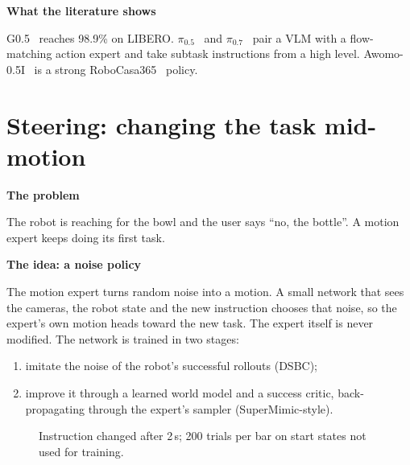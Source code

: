 \documentclass[11pt,a4paper]{article}
\newcommand{\pzf}{$\pi_{0.5}$}
\newcommand{\pzs}{$\pi_{0.7}$}
\newcommand{\sub}[1]{\par\needspace{4\baselineskip}\smallskip\noindent\textbf{#1}\par}
\begin{document}
\sub{What the literature shows}
G0.5~\cite{g05} reaches 98.9\% on LIBERO. \pzf~\cite{pi05} and \pzs~\cite{pi07} pair a VLM with a flow-matching action expert and take subtask instructions from a high level. Awomo-0.5I~\cite{awomo} is a strong RoboCasa365~\cite{robocasa365} policy.

\section{Steering: changing the task mid-motion}
\label{sec:steer}
\sub{The problem}
The robot is reaching for the bowl and the user says ``no, the bottle''. A motion expert keeps doing its first task.

\sub{The idea: a noise policy}
The motion expert turns random noise into a motion. A small network that sees the cameras, the robot state and the new instruction chooses that noise, so the expert's own motion heads toward the new task. The expert itself is never modified. The network is trained in two stages:
\begin{enumerate}
\item imitate the noise of the robot's successful rollouts (DSBC);
\item improve it through a learned world model and a success critic, back-propagating through the expert's sampler (SuperMimic-style).
\end{enumerate}

\begin{figure}[!htbp]\centering
{}
\caption{Instruction changed after 2\,s; 200 trials per bar on start states not used for training.}
\label{fig:steer}
\end{figure}
\end{document}
